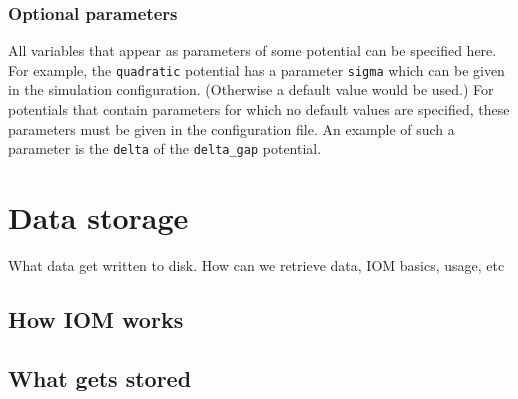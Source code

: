 \documentclass[a4paper,10pt]{report}
\begin{document}
%
%

\subsubsection{Optional parameters}

All variables that appear as parameters of some potential can be specified
here. For example, the \texttt{quadratic} potential has a parameter \texttt{sigma}
which can be given in the simulation configuration. (Otherwise a default value
would be used.) For potentials that contain parameters for which no default
values are specified, these parameters must be given in the configuration file.
An example of such a parameter is the \texttt{delta} of the \texttt{delta\_gap} potential.


\section{Data storage}

What data get written to disk. How can we retrieve data, IOM basics, usage, etc

\subsection{How IOM works}

\subsection{What gets stored}
\end{document}
